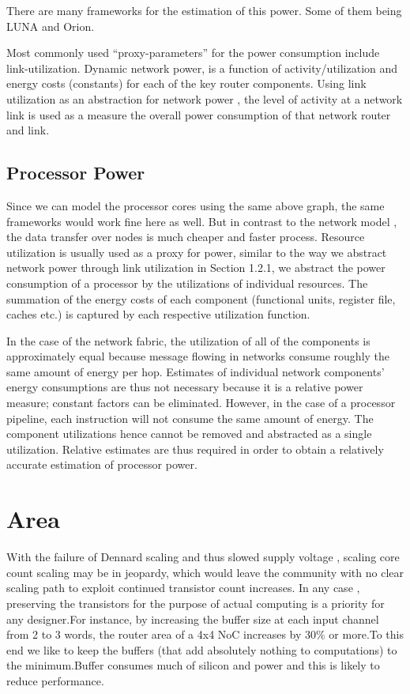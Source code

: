 There are many frameworks for the estimation of this power. Some of
them being LUNA and Orion.

Most commonly used ``proxy-parameters'' for the power consumption
include link-utilization. Dynamic network power, is a function of
activity/utilization and energy costs (constants) for each of the
key router components. Using link utilization as an abstraction for
network power , the level of activity at a network link is used as
a measure the overall power consumption of that network router and
link.\cite{Eisley:2004:HPA:1023833.1023849}


\subsection{Processor Power }

Since we can model the processor cores using the same above graph,
the same frameworks would work fine here as well. But in contrast
to the network model , the data transfer over nodes is much cheaper
and faster process. Resource utilization is usually used as a proxy
for power, similar to the way we abstract network power through link
utilization in Section 1.2.1, we abstract the power consumption of
a processor by the utilizations of individual resources. The summation
of the energy costs of each component (functional units, register
file, caches etc.) is captured by each respective utilization function. 

In the case of the network fabric, the utilization of all of the components
is approximately equal because message flowing in networks consume
roughly the same amount of energy per hop. Estimates of individual
network components\textquoteright{} energy consumptions are thus not
necessary because it is a relative power measure; constant factors
can be eliminated. However, in the case of a processor pipeline, each
instruction will not consume the same amount of energy. The component
utilizations hence cannot be removed and abstracted as a single utilization.
Relative estimates are thus required in order to obtain a relatively
accurate estimation of processor power.


\section{Area}

With the failure of Dennard scaling and thus slowed supply voltage
, scaling core count scaling may be in jeopardy, which would leave
the community with no clear scaling path to exploit continued transistor
count increases. In any case , preserving the transistors for the
purpose of actual computing is a priority for any designer.For instance,
by increasing the buffer size at each input channel from 2 to 3 words,
the router area of a 4x4 NoC increases by 30\% or more\cite{Ogras:2005:KRP:1084834.1084856}.To
this end we like to keep the buffers (that add absolutely nothing
to computations) to the minimum.Buffer consumes much of silicon and
power and this is likely to reduce performance. 
